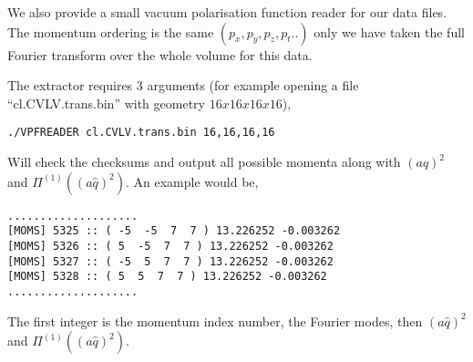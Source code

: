 We also provide a small vacuum polarisation function reader for our
data files. The momentum ordering is the same $(p_x,p_y,p_z,p_t..)$
only we have taken the full Fourier transform over the whole volume
for this data.

The extractor requires 3 arguments (for example opening a file 
``cl.CVLV.trans.bin'' with geometry $16x16x16x16$),
\begin{verbatim}
./VPFREADER cl.CVLV.trans.bin 16,16,16,16
\end{verbatim}
Will check the checksums and output all possible momenta along
with $(a\hat{q})^2$ and $\Pi^{(1)}((a\hat{q})^2)$. An example would
be,
\begin{verbatim}
....................
[MOMS] 5325 :: ( -5  -5  7  7 ) 13.226252 -0.003262 
[MOMS] 5326 :: ( 5  -5  7  7 ) 13.226252 -0.003262 
[MOMS] 5327 :: ( -5  5  7  7 ) 13.226252 -0.003262 
[MOMS] 5328 :: ( 5  5  7  7 ) 13.226252 -0.003262
....................
\end{verbatim}
The first integer is the momentum index number, the 
Fourier modes, then $(a\hat{q})^2$ and $\Pi^{(1)}((a\hat{q})^2)$.
